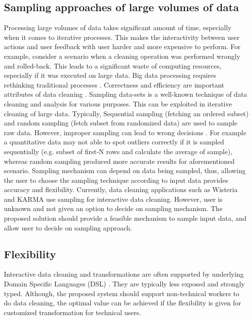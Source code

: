 \subsection{Sampling approaches of large volumes of data}
\noindent Processing large volumes of data takes significant amount of time, especially when it comes to iterative processes. This makes the interactivity between user actions and user feedback with user harder and more expensive to perform. For example, consider a scenario when a cleaning operation was performed wrongly and rolled-back. This leads to a significant waste of computing resources, especially if it was executed on large data. Big data processing requires rethinking traditional processes \cite{nemreport}. Correctness and efficiency are important attributes of data cleaning \cite{journals/corr/KrishnanW0FG16}. Sampling data-sets is a well-known technique of data cleaning and analysis \cite{Hellerstein08quantitativedata} for various purposes. This can be exploited in iterative cleaning of large data. Typically, Sequential sampling (fetching an ordered subset) and random sampling (fetch subset from randomized data) are used to sample raw data. However, improper sampling can lead to wrong decisions \cite{journals/corr/KrishnanW0FG16}. For example a quantitative data may not able to spot outliers correctly if it is sampled sequentially (e.g. subset of first-N rows and calculate the average of sample), whereas random sampling produced more accurate results for aforementioned scenario\cite{Hellerstein08quantitativedata}. Sampling mechanism can depend on data being sampled, thus, allowing the user to choose the sampling technique according to input data provides accuracy and flexibility. Currently, data cleaning applications such as Wisteria \cite{Wisteria} and KARMA  \cite{knoblock15:aimag} use sampling for interactive data cleaning. However, user is unknown and not given an option to decide on sampling mechanism. The proposed solution should provide a feasible mechanism to sample input data, and allow user to decide on sampling approach. 
\subsection{Flexibility}
\noindent Interactive data cleaning and transformations are often supported by underlying Domain Specific Languages (DSL) \cite{Wisteria}. They are typically less exposed and strongly typed. Although, the proposed system should support non-technical workers to do data cleaning, the optimal value can be achieved if the flexibility is given for customized transformation for technical users. 
